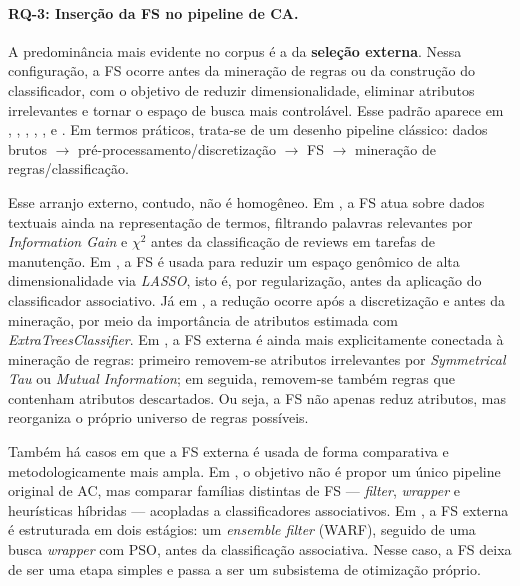 \paragraph*{RQ-3: Inserção da FS no pipeline de CA.}
A predominância mais evidente no corpus é a da \textbf{seleção externa}. Nessa configuração, a FS ocorre antes da mineração de regras ou da construção do classificador, com o objetivo de reduzir dimensionalidade, eliminar atributos irrelevantes e tornar o espaço de busca mais controlável. Esse padrão aparece em \cite{alhawari2021classification}, \cite{ashi2021enhancing}, \cite{cicek2021assessment}, \cite{piri2019exploring}, \cite{alazaidah2021feature}, \cite{sowan2023hybrid} e \cite{shaharanee2015irrelevant}. Em termos práticos, trata-se de um desenho pipeline clássico: dados brutos $\rightarrow$ pré-processamento/discretização $\rightarrow$ FS $\rightarrow$ mineração de regras/classificação.

Esse arranjo externo, contudo, não é homogêneo. Em \cite{alhawari2021classification}, a FS atua sobre dados textuais ainda na representação de termos, filtrando palavras relevantes por \textit{Information Gain} e $\chi^2$ antes da classificação de reviews em tarefas de manutenção. Em \cite{cicek2021assessment}, a FS é usada para reduzir um espaço genômico de alta dimensionalidade via \textit{LASSO}, isto é, por regularização, antes da aplicação do classificador associativo. Já em \cite{piri2019exploring}, a redução ocorre após a discretização e antes da mineração, por meio da importância de atributos estimada com \textit{ExtraTreesClassifier}. Em \cite{shaharanee2015irrelevant}, a FS externa é ainda mais explicitamente conectada à mineração de regras: primeiro removem-se atributos irrelevantes por \textit{Symmetrical Tau} ou \textit{Mutual Information}; em seguida, removem-se também regras que contenham atributos descartados. Ou seja, a FS não apenas reduz atributos, mas reorganiza o próprio universo de regras possíveis.

Também há casos em que a FS externa é usada de forma comparativa e metodologicamente mais ampla. Em \cite{alazaidah2021feature}, o objetivo não é propor um único pipeline original de AC, mas comparar famílias distintas de FS --- \textit{filter}, \textit{wrapper} e heurísticas híbridas --- acopladas a classificadores associativos. Em \cite{sowan2023hybrid}, a FS externa é estruturada em dois estágios: um \textit{ensemble filter} (WARF), seguido de uma busca \textit{wrapper} com PSO, antes da classificação associativa. Nesse caso, a FS deixa de ser uma etapa simples e passa a ser um subsistema de otimização próprio.

